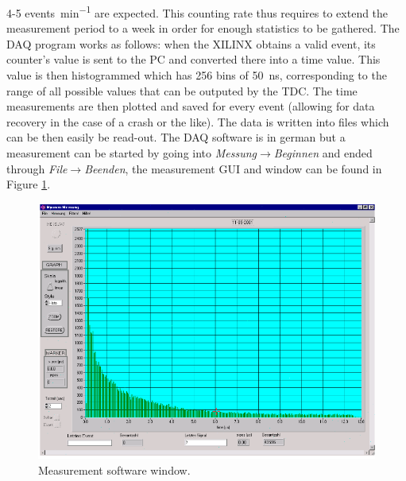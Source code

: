 4-5 \si{events\per\minute} are expected. This counting rate thus requires to extend the measurement period to a week in order for enough statistics to be gathered. The DAQ program works as follows: when the XILINX obtains a valid event, its counter's value is sent to the PC and converted there into a time value. This value is then histogrammed which has 256 bins of \SI{50}{\nano\second}, corresponding to the range of all possible values that can be outputed by the TDC. The time measurements are then plotted and saved for every event (allowing for data recovery in the case of a crash or the like). The data is written into files which can be then easily be read-out. The DAQ software is in german but a measurement can be started by going into \textit{Messung}$\rightarrow$\textit{Beginnen} and ended through \textit{File}$\rightarrow$\textit{Beenden}, the measurement GUI and window can be found in Figure \ref{fig:MP}.

\begin{figure}
\centering
\includegraphics[width=\linewidth]{./fig/MP.png}
\caption{Measurement software window.}
\label{fig:MP}
\end{figure}
